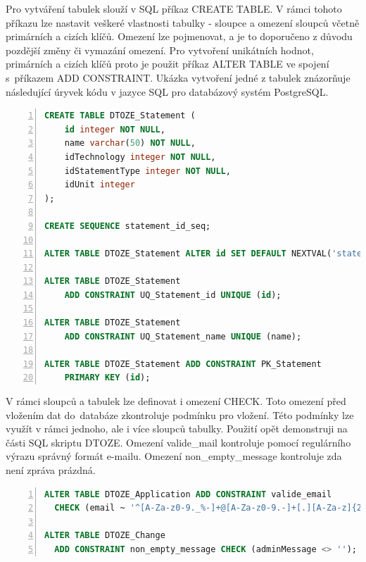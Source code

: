 \documentclass[11pt,a4paper]{article}
\begin{document}
Pro vytváření tabulek slouží v SQL příkaz CREATE TABLE. V rámci tohoto příkazu lze nastavit veškeré vlastnosti tabulky - sloupce a omezení sloupců včetně primárních a cizích klíčů. Omezení lze pojmenovat, a je to doporučeno z důvodu pozdější změny či vymazání omezení. Pro vytvoření unikátních hodnot, primárních a cizích klíčů proto je použit příkaz ALTER TABLE ve spojení s~příkazem ADD CONSTRAINT. Ukázka vytvoření jedné z tabulek znázorňuje následující úryvek kódu v jazyce SQL pro databázový systém PostgreSQL.   

\begin{lstlisting}[language=SQL, label=DescriptiveLabel, backgroundcolor=\color{grey}, numbers=left, basicstyle=\footnotesize]
CREATE TABLE DTOZE_Statement ( 
	id integer NOT NULL,
	name varchar(50) NOT NULL,
	idTechnology integer NOT NULL,
	idStatementType integer NOT NULL,
	idUnit integer
);

CREATE SEQUENCE statement_id_seq;

ALTER TABLE DTOZE_Statement ALTER id SET DEFAULT NEXTVAL('statement_id_seq');

ALTER TABLE DTOZE_Statement
	ADD CONSTRAINT UQ_Statement_id UNIQUE (id);

ALTER TABLE DTOZE_Statement
	ADD CONSTRAINT UQ_Statement_name UNIQUE (name);

ALTER TABLE DTOZE_Statement ADD CONSTRAINT PK_Statement 
	PRIMARY KEY (id);
\end{lstlisting}
\vspace{0.5cm}

V rámci sloupců a tabulek lze definovat i omezení CHECK. Toto omezení před vložením dat do~databáze zkontroluje podmínku pro vložení. Této podmínky lze využít v rámci jednoho, ale i více sloupců tabulky. Použití opět demonstruji na části SQL skriptu DTOZE. Omezení valide\_mail kontroluje pomocí regulárního výrazu správný formát e-mailu. Omezení non\_empty\_message kontroluje zda není zpráva prázdná. 

\vspace{0.5cm}
\begin{lstlisting}[language=SQL, label=DescriptiveLabel, backgroundcolor=\color{grey}, numbers=left, basicstyle=\footnotesize]
ALTER TABLE DTOZE_Application ADD CONSTRAINT valide_email 
  CHECK (email ~ '^[A-Za-z0-9._%-]+@[A-Za-z0-9.-]+[.][A-Za-z]{2,6}$');
  
ALTER TABLE DTOZE_Change
  ADD CONSTRAINT non_empty_message CHECK (adminMessage <> '');
\end{lstlisting}
\vspace{0.5cm}
\end{document}
